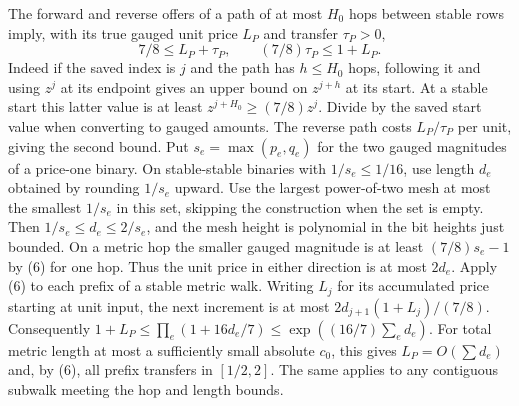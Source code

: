 \documentclass[11pt]{article}
\begin{document}
The forward and reverse offers of a path of at most \(H_0\) hops between stable rows imply, with its true gauged unit price \(L_P\) and transfer \(\tau_P>0\),
\[
 7/8\le L_P+\tau_P,\qquad (7/8)\tau_P\le1+L_P .
\tag{6}
\]
Indeed if the saved index is \(j\) and the path has \(h\le H_0\) hops, following it and using \(z^j\) at its endpoint gives an upper bound on \(z^{j+h}\) at its start. At a stable start this latter value is at least \(z^{j+H_0}\ge(7/8)z^j\). Divide by the saved start value when converting to gauged amounts. The reverse path costs \(L_P/\tau_P\) per unit, giving the second bound. Put \(s_e=\max(p_e,q_e)\) for the two gauged magnitudes of a price-one binary. On stable-stable binaries with \(1/s_e\le1/16\), use length \(d_e\) obtained by rounding \(1/s_e\) upward. Use the largest power-of-two mesh at most the smallest \(1/s_e\) in this set, skipping the construction when the set is empty. Then \(1/s_e\le d_e\le2/s_e\), and the mesh height is polynomial in the bit heights just bounded. On a metric hop the smaller gauged magnitude is at least \((7/8)s_e-1\) by (6) for one hop. Thus the unit price in either direction is at most \(2d_e\). Apply (6) to each prefix of a stable metric walk. Writing \(L_j\) for its accumulated price starting at unit input, the next increment is at most \(2d_{j+1}(1+L_j)/(7/8)\). Consequently \(1+L_P\le\prod_e(1+16d_e/7)\le\exp((16/7)\sum_e d_e)\). For total metric length at most a sufficiently small absolute \(c_0\), this gives \(L_P=O(\sum d_e)\) and, by (6), all prefix transfers in \([1/2,2]\). The same applies to any contiguous subwalk meeting the hop and length bounds.
\end{document}

